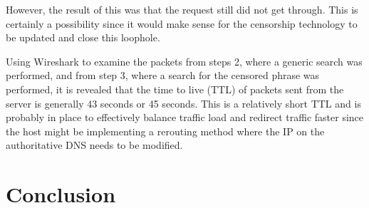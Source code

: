 \documentclass[11pt]{article}
\begin{document}
However, the result of this was that the request still did not get through. This is certainly a possibility
since it would make sense for the censorship technology to be updated and close this loophole.

Using Wireshark to examine the packets from steps 2, where a generic search was performed, and from
step 3, where a search for the censored phrase was performed, it is revealed that the time to live (TTL)
of packets sent from the server is generally 43 seconds or 45 seconds. This is a relatively short TTL
and is probably in place to effectively balance traffic load and redirect traffic faster since the host
might be implementing a rerouting method where the IP on the authoritative DNS needs to be modified.
\section*{Conclusion}


\end{document}

